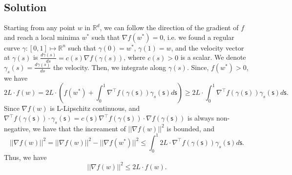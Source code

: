 \documentclass[11pt]{report}
\newcommand{\T}{\intercal}
\newcommand{\reals}{\mathbb{R}}
\begin{document}
\subsection*{Solution}
Starting from any point $w$ in $\reals^d$, we can follow the direction of the gradient of $f$ and reach a local minima $w^*$ such that $\nabla f(w^*) = 0$, i.e. we found a regular curve $\gamma: [0,1] \mapsto \reals^n$ such that $\gamma(0) = w^*$, $\gamma(1) = w$, and the velocity vector at $\gamma(s)$ is $\frac{d \gamma(s)}{ds} = c(s) \nabla f(\gamma(s))$, where $c(s)>0$ is a scalar. We denote $\gamma_s(s) = \frac{d \gamma(s)}{ds}$ the velocity. Then, we integrate along $\gamma(s)$. Since, $f(w^*)>0$, we have
$$2L \cdot f(w) = 2L \cdot \left(f(w^*) + \int_{0}^{1} \nabla^\T f(\gamma(\bm{\mathsf{s}})) \gamma_s(\bm{\mathsf{s}}) d\bm{\mathsf{s}}\right) \geq 2L \cdot \int_{0}^{1} \nabla^\T f(\gamma(\bm{\mathsf{s}})) \gamma_s(\bm{\mathsf{s}}) d\bm{\mathsf{s}}.$$
Since $\nabla f(w)$ is L-Lipschitz continuous, and $\nabla^\T f(\gamma(\bm{\mathsf{s}})) \cdot \gamma_s(\bm{\mathsf{s}}) = c(\bm{\mathsf{s}}) \nabla^\T f(\gamma(\bm{\mathsf{s}})) \cdot \nabla f(\gamma(\bm{\mathsf{s}}))$ is always non-negative, we have that the increament of $||\nabla f(w)||^2$ is bounded, and
%
$$||\nabla f(w)||^2 = ||\nabla f(w)||^2 - ||\nabla f(w^*)||^2 \leq \int_{0}^{1} 2L \cdot \nabla^\T f(\gamma(\bm{\mathsf{s}})) \gamma_s(\bm{\mathsf{s}}) d\bm{\mathsf{s}}.$$
%
Thus, we have
$$||\nabla f(w)||^2 \leq 2L \cdot f(w).$$
\end{document}
